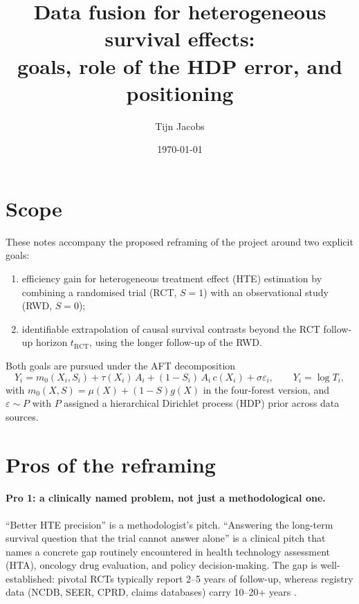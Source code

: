 \documentclass[11pt]{article}
\title{Data fusion for heterogeneous survival effects:\\
goals, role of the HDP error, and positioning}
\author{Tijn Jacobs}
\date{\today}
\theoremstyle{plain}
\theoremstyle{definition}
\theoremstyle{remark}
\newcommand{\1}{\mathds{1}}
\newcommand{\X}{X}
\newcommand{\A}{A}
\newcommand{\Sx}{S}
\newcommand{\tauf}{\tau}
\newcommand{\cf}{c}
\newcommand{\gf}{g}
\newcommand{\muf}{\mu}
\newcommand{\mzero}{m_{0}}
\newcommand{\RCT}{\mathrm{RCT}}
\begin{document}
\maketitle

\section*{Scope}

These notes accompany the proposed reframing of the project around two
explicit goals:
\begin{enumerate}[label=(G\arabic*),leftmargin=*]
  \item efficiency gain for heterogeneous treatment effect (HTE) estimation by
        combining a randomised trial (RCT, $\Sx=1$) with an observational
        study (RWD, $\Sx=0$);
  \item identifiable extrapolation of causal survival contrasts beyond the
        RCT follow-up horizon $t_{\RCT}$, using the longer follow-up of the RWD.
\end{enumerate}
Both goals are pursued under the AFT decomposition
\begin{equation}
  Y_i = \mzero(\X_i, \Sx_i) + \tauf(\X_i)\,\A_i
        + (1-\Sx_i)\,\A_i\,\cf(\X_i) + \sigma\varepsilon_i,
  \qquad Y_i = \log T_i,
  \label{eq:decomp}
\end{equation}
with $\mzero(\X,\Sx) = \muf(\X) + (1-\Sx)\gf(\X)$ in the four-forest version,
and $\varepsilon \sim P$ with $P$ assigned a hierarchical Dirichlet process
(HDP) prior across data sources.

\section{Pros of the reframing}

\paragraph{Pro 1: a clinically named problem, not just a methodological one.}
``Better HTE precision'' is a methodologist's pitch. ``Answering the long-term
survival question that the trial cannot answer alone'' is a clinical pitch
that names a concrete gap routinely encountered in health technology
assessment (HTA), oncology drug evaluation, and policy decision-making. The
gap is well-established: pivotal RCTs typically report 2--5 years of
follow-up, whereas registry data (NCDB, SEER, CPRD, claims databases) carry
10--20+ years \citep{Latimer2013, Jackson2023, Guyot2017}.
\end{document}
